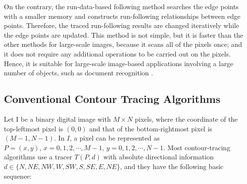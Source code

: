 \documentclass[sensors,article,accept,moreauthors,pdftex,10pt,a4paper]{mdpi}
\begin{document}
On the contrary, the run-data-based following method searches the edge points with a smaller memory and constructs run-following relationships between edge points. Therefore, the traced run-following results are changed iteratively while the edge points are updated. This method is not simple, but it is faster than the other methods for large-scale images, because it scans all of the pixels once; and it does not require any additional operations to be carried out on the pixels. Hence, it is suitable for large-scale image-based applications involving a large number of objects, such as document recognition \cite{Miyatake1997Contour}.

\subsection{Conventional Contour Tracing Algorithms}


Let I
 be a binary digital image with $M \times N$ pixels, where the coordinate of the top-leftmost pixel is $(0, 0)$ and that of the bottom-rightmost pixel is $(M - 1, N - 1)$. In $I$, a pixel can be represented as $P = (x, y),\, x = 0,1,2,\cdots,M-1,\, y = 0,1,2,\cdots, N-1$. Most contour-tracing algorithms use a tracer $T (P, d)$ with absolute directional information $d\in\{N,NE,NW,W,SW,S,SE,E,NE\}$, and they have the following basic sequence: 

\end{document}
